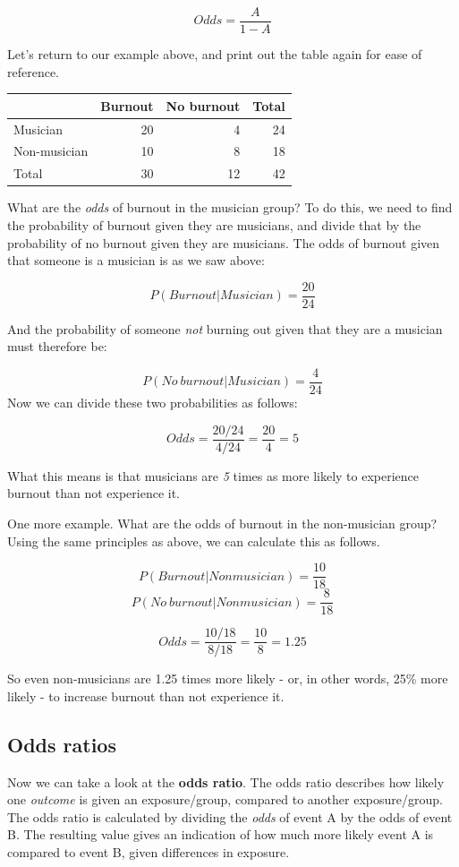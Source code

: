\documentclass[
]{book}
\begin{document}
\[
Odds = \frac{A}{1-A}
\]

Let's return to our example above, and print out the table again for ease of reference.

\begin{tabular}{l|r|r|r}
\hline
 & Burnout & No burnout & Total\\
\hline
Musician & 20 & 4 & 24\\
\hline
Non-musician & 10 & 8 & 18\\
\hline
Total & 30 & 12 & 42\\
\hline
\end{tabular}

What are the \emph{odds} of burnout in the musician group? To do this, we need to find the probability of burnout given they are musicians, and divide that by the probability of no burnout given they are musicians. The odds of burnout given that someone is a musician is as we saw above:

\[
P(Burnout | Musician) = \frac{20}{24}
\]

And the probability of someone \emph{not} burning out given that they are a musician must therefore be:

\[
P(No \ burnout | Musician) = \frac{4}{24}
\]
Now we can divide these two probabilities as follows:

\[
Odds = \frac{20/24}{4/24} = \frac{20}{4} = 5
\]

What this means is that musicians are \emph{5} times as more likely to experience burnout than not experience it.

One more example. What are the odds of burnout in the non-musician group? Using the same principles as above, we can calculate this as follows.

\[
P(Burnout | Nonmusician) = \frac{10}{18}
\]
\[
P(No \ burnout | Nonmusician) = \frac{8}{18}
\]

\[
Odds = \frac{10/18}{8/18} = \frac{10}{8} = 1.25
\]

So even non-musicians are 1.25 times more likely - or, in other words, 25\% more likely - to increase burnout than not experience it.

\hypertarget{odds-ratios}{%
\subsection{Odds ratios}\label{odds-ratios}}

Now we can take a look at the \textbf{odds ratio}. The odds ratio describes how likely one \emph{outcome} is given an exposure/group, compared to another exposure/group. The odds ratio is calculated by dividing the \emph{odds} of event A by the odds of event B. The resulting value gives an indication of how much more likely event A is compared to event B, given differences in exposure.
\end{document}
